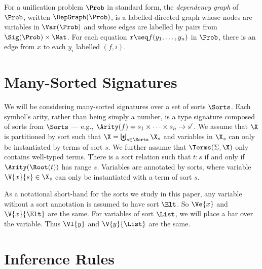 For a unification problem $\Prob$ in standard form, the \emph{dependency graph}
of $\Prob$, written $\DepGraph(\Prob)$, is a labelled directed graph whose
nodes are variables in $\Var(\Prob)$ and whose edges are labelled by pairs from
$\Sig(\Prob) \times \Nat$.  For each equation $x \ueq f(y_1, \dotsc, y_n)$ in
$\Prob$, there is an edge from $x$ to each $y_i$ labelled $(f, i)$.

\section{Many-Sorted Signatures}\label{sec:sorts}

We will be considering many-sorted signatures over a set of sorts $\Sorts$.
Each symbol's arity, rather than being simply a number, is a type signature
composed of sorts from $\Sorts$ --- e.g., $\Arity(f) = s_1 \times \dotsb \times
s_n \to s'$. We assume that $\X$ is partitioned by sort such that $\X =
\biguplus_{s \in \Sorts} \X_{s}$ and variables in $\X_{s}$ can only be
instantiated by terms of sort $s$. We further assume that $\Terms(\Sigma, \X)$
only contains well-typed terms. There is a sort relation such that $t : s$ if
and only if $\Arity(\Root(t))$ has range $s$. Variables are annotated by sorts,
where variable $\V{x}{s} \in \X_s$ can only be instantiated with a term of sort
$s$.

As a notational short-hand for the sorts we study in this paper, any variable
without a sort annotation is assumed to have sort $\Elt$. So $\Ve{x}$ and
$\V{x}{\Elt}$ are the same. For variables of sort $\List$, we will place a bar
over the variable. Thus $\Vl{y}$ and $\V{y}{\List}$ are the same.

\section{Inference Rules}\label{sec:inf-rules}

